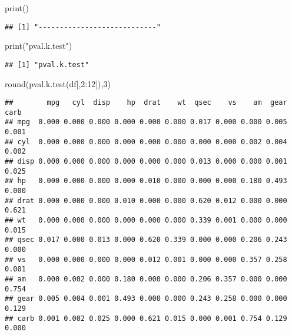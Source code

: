 \documentclass[
]{article}
\newenvironment{Shaded}{\begin{snugshade}}{\end{snugshade}}
\newcommand{\DecValTok}[1]{\textcolor[rgb]{0.00,0.00,0.81}{#1}}
\newcommand{\FunctionTok}[1]{\textcolor[rgb]{0.00,0.00,0.00}{#1}}
\newcommand{\NormalTok}[1]{#1}
\newcommand{\SpecialCharTok}[1]{\textcolor[rgb]{0.00,0.00,0.00}{#1}}
\newcommand{\StringTok}[1]{\textcolor[rgb]{0.31,0.60,0.02}{#1}}
\begin{document}
\begin{Shaded}
\begin{Highlighting}[]
\FunctionTok{print}\NormalTok{(}\StringTok{\textquotesingle{}{-}{-}{-}{-}{-}{-}{-}{-}{-}{-}{-}{-}{-}{-}{-}{-}{-}{-}{-}{-}{-}{-}{-}{-}{-}{-}{-}{-}\textquotesingle{}}\NormalTok{)}
\end{Highlighting}
\end{Shaded}

\begin{verbatim}
## [1] "----------------------------"
\end{verbatim}

\begin{Shaded}
\begin{Highlighting}[]
\FunctionTok{print}\NormalTok{(}\StringTok{"pval.k.test"}\NormalTok{)}
\end{Highlighting}
\end{Shaded}

\begin{verbatim}
## [1] "pval.k.test"
\end{verbatim}

\begin{Shaded}
\begin{Highlighting}[]
\FunctionTok{round}\NormalTok{(}\FunctionTok{pval.k.test}\NormalTok{(df[,}\DecValTok{2}\SpecialCharTok{:}\DecValTok{12}\NormalTok{]),}\DecValTok{3}\NormalTok{)}
\end{Highlighting}
\end{Shaded}

\begin{verbatim}
##        mpg   cyl  disp    hp  drat    wt  qsec    vs    am  gear  carb
## mpg  0.000 0.000 0.000 0.000 0.000 0.000 0.017 0.000 0.000 0.005 0.001
## cyl  0.000 0.000 0.000 0.000 0.000 0.000 0.000 0.000 0.002 0.004 0.002
## disp 0.000 0.000 0.000 0.000 0.000 0.000 0.013 0.000 0.000 0.001 0.025
## hp   0.000 0.000 0.000 0.000 0.010 0.000 0.000 0.000 0.180 0.493 0.000
## drat 0.000 0.000 0.000 0.010 0.000 0.000 0.620 0.012 0.000 0.000 0.621
## wt   0.000 0.000 0.000 0.000 0.000 0.000 0.339 0.001 0.000 0.000 0.015
## qsec 0.017 0.000 0.013 0.000 0.620 0.339 0.000 0.000 0.206 0.243 0.000
## vs   0.000 0.000 0.000 0.000 0.012 0.001 0.000 0.000 0.357 0.258 0.001
## am   0.000 0.002 0.000 0.180 0.000 0.000 0.206 0.357 0.000 0.000 0.754
## gear 0.005 0.004 0.001 0.493 0.000 0.000 0.243 0.258 0.000 0.000 0.129
## carb 0.001 0.002 0.025 0.000 0.621 0.015 0.000 0.001 0.754 0.129 0.000
\end{verbatim}
\end{document}
